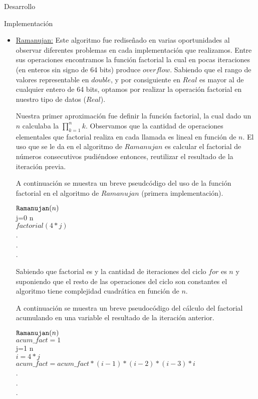 \begin{section}{Desarrollo}
\begin{subsection}{Implementación}
\begin{itemize}
			\item \underline{Ramanujan:} Este algoritmo fue rediseñado en varias oportunidades al observar diferentes problemas en cada implementación que realizamos. Entre sus operaciones encontramos la función factorial la cual en pocas iteraciones (en enteros sin signo de 64 bits) produce $overflow$. Sabiendo que el rango de valores representable en $double$, y por consiguiente en $Real$ es mayor al de cualquier entero de 64 bits, optamos por realizar la operación factorial en nuestro tipo de datos ($Real$).
			
		Nuestra primer aproximación fue definir la función factorial, la cual dado un $n$ calculaba la $\prod_{k=1}^{n}{k}$. Observamos que la cantidad de operaciones elementales que factorial realiza en cada llamada es lineal en función de $n$. El uso que se le da en el algoritmo de $Ramanujan$ es calcular el factorial de números consecutivos pudiéndose entonces, reutilizar el resultado de la iteración previa.\VSP
		
		A continuación se muestra un breve pseudcódigo del uso de la función factorial en el algoritmo de $Ramanujan$ (primera implementación).
		
		$\texttt{Ramanujan}(n)$\\
		\tab\FOR j=0 \TO n\\
		\tab\tab$factorial(4*j)$\\
		\tab\tab\tab.\\
		\tab\tab\tab.\\
		\tab\tab\tab.\\
		\tab\END
		
		\VSP
		
		Sabiendo que factorial es  y la cantidad de iteraciones del ciclo $for$ es $n$ y suponiendo que el resto de las operaciones del ciclo son constantes el algoritmo tiene complejidad cuadrática en función de $n$.\VSP

		A continuación se muestra un breve pseudocódigo del cálculo del factorial acumulando en una variable el resultado de la iteración anterior.\VSP
		
		$\texttt{Ramanujan}(n)$\\
		\tab $acum\_fact=1$\\
		\tab\FOR j=1 \TO n\\
		\tab\tab $i = 4*j$\\
		\tab\tab$acum\_fact = acum\_fact*(i-1)*(i-2)*(i-3)*i$\\
		\tab\tab\tab.\\
		\tab\tab\tab.\\
		\tab\tab\tab.\\
		\tab\END
		

\end{itemize}
\end{subsection}
\end{section}
